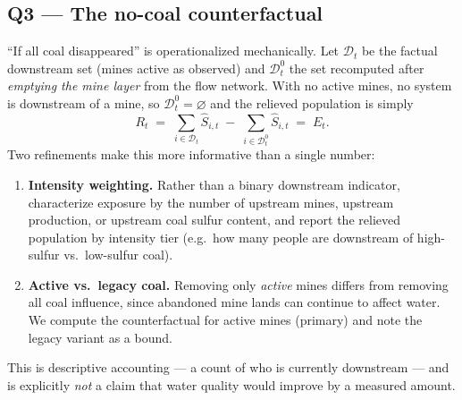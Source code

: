 \documentclass[11pt]{article}
\newcommand{\popserved}{\ensuremath{S}}
\begin{document}
\subsection{Q3 --- The no-coal counterfactual}
\label{sec:counterfactual}
``If all coal disappeared'' is operationalized mechanically. Let $\mathcal{D}_t$ be
the factual downstream set (mines active as observed) and $\mathcal{D}^{0}_t$ the set
recomputed after \emph{emptying the mine layer} from the flow network. With no active
mines, no system is downstream of a mine, so $\mathcal{D}^{0}_t=\varnothing$ and the
relieved population is simply
\begin{equation}
R_t \;=\; \sum_{i\in\mathcal{D}_t}\hat{\popserved}_{i,t} \;-\;
          \sum_{i\in\mathcal{D}^{0}_t}\hat{\popserved}_{i,t}
        \;=\; E_t .
\end{equation}
Two refinements make this more informative than a single number:
\begin{enumerate}[leftmargin=2em]
  \item \textbf{Intensity weighting.} Rather than a binary downstream indicator,
    characterize exposure by the number of upstream mines, upstream production, or
    upstream coal sulfur content, and report the relieved population by intensity tier
    (e.g.\ how many people are downstream of high-sulfur vs.\ low-sulfur coal).
  \item \textbf{Active vs.\ legacy coal.} Removing only \emph{active} mines differs
    from removing all coal influence, since abandoned mine lands can continue to affect
    water. We compute the counterfactual for active mines (primary) and note the
    legacy variant as a bound.
\end{enumerate}
This is descriptive accounting --- a count of who is currently downstream --- and is
explicitly \emph{not} a claim that water quality would improve by a measured amount.
\end{document}
